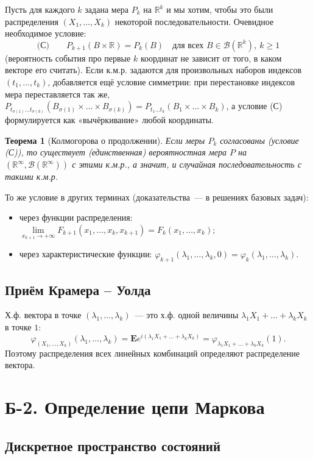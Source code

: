\documentclass[11pt,a4paper]{article}
\newtheorem{thm}{Теорема}[section]
\theoremstyle{definition}
\newcommand{\EE}{\mathbf E}
\newcommand{\R}{\mathbb R}
\newcommand{\B}{\mathcal B}
\newcommand{\1}{\mathbf 1}
\begin{document}
Пусть для каждого $k$ задана мера $P_k$ на $\R^k$ и мы хотим, чтобы это были
распределения $(X_1,\dots,X_k)$ некоторой последовательности. Очевидное
необходимое условие:
\[
\text{(С)}\qquad P_{k+1}(B\times\R)=P_k(B)\quad\text{для всех }B\in\B(\R^k),\ k\ge1
\]
(вероятность события про первые $k$ координат не зависит от того, в каком
векторе его считать). Если к.м.р. задаются для произвольных наборов индексов
$(t_1,\dots,t_k)$, добавляется ещё условие симметрии: при перестановке индексов
мера переставляется так же,
$P_{t_{\sigma(1)}\dots t_{\sigma(k)}}(B_{\sigma(1)}\times\dots\times B_{\sigma(k)})
=P_{t_1\dots t_k}(B_1\times\dots\times B_k)$, а условие (С) формулируется
как «вычёркивание» любой координаты.

\begin{thm}[Колмогорова о продолжении]
Если меры $P_k$ согласованы (условие (С)), то существует (единственная)
вероятностная мера $P$ на $(\R^\infty,\B(\R^\infty))$ с этими к.м.р., а значит,
и случайная последовательность с такими к.м.р.
\end{thm}

То же условие в других терминах (доказательства~--- в решениях базовых задач):
\begin{itemize}[nosep]
\item через функции распределения:
$\lim\limits_{x_{k+1}\to+\infty}F_{k+1}(x_1,\dots,x_k,x_{k+1})=F_k(x_1,\dots,x_k)$;
\item через характеристические функции:
$\varphi_{k+1}(\lambda_1,\dots,\lambda_k,0)=\varphi_k(\lambda_1,\dots,\lambda_k)$.
\end{itemize}

\subsection{Приём Крамера -- Уолда}

Х.ф. вектора в точке $(\lambda_1,\dots,\lambda_k)$~--- это х.ф. одной величины
$\lambda_1X_1+\dots+\lambda_kX_k$ в точке $1$:
\[
\varphi_{(X_1,\dots,X_k)}(\lambda_1,\dots,\lambda_k)=\EE e^{i(\lambda_1X_1+\dots+\lambda_kX_k)}
=\varphi_{\lambda_1X_1+\dots+\lambda_kX_k}(1).
\]
Поэтому распределения всех линейных комбинаций определяют распределение вектора.

\section{Б-2. Определение цепи Маркова}

\subsection{Дискретное пространство состояний}
\end{document}
